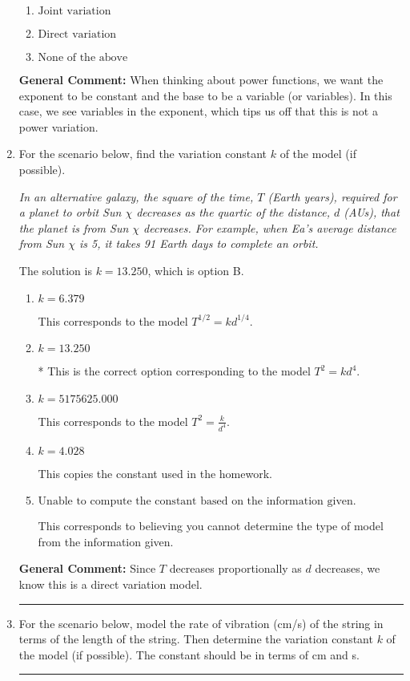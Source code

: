\documentclass{extbook}[14pt]
\newcommand{\litem}[1]{\item #1

\rule{\textwidth}{0.4pt}}
\begin{document}
\begin{enumerate}
{\begin{enumerate}[label=\Alph*.]
\item \( \text{Joint variation} \)


\item \( \text{Direct variation} \)


\item \( \text{None of the above} \)


\end{enumerate}

\textbf{General Comment:} When thinking about power functions, we want the exponent to be constant and the base to be a variable (or variables). In this case, we see variables in the exponent, which tips us off that this is not a power variation.
}
\litem{
For the scenario below, find the variation constant $k$ of the model (if possible).

\begin{center}
    \textit{ In an alternative galaxy, the square of the time, $T$ (Earth years), required for a planet to orbit Sun $\chi$ decreases as the quartic of the distance, $d$ (AUs), that the planet is from Sun $\chi$ decreases. For example, when Ea's average distance from Sun $\chi$ is 5, it takes 91 Earth days to complete an orbit. }
\end{center}
The solution is \( k = 13.250 \), which is option B.\begin{enumerate}[label=\Alph*.]
\item \( k = 6.379 \)

This corresponds to the model $T^{1/2} = k d^{1/4}$.
\item \( k = 13.250 \)

* This is the correct option corresponding to the model $T^{2} = k d^{4}$.
\item \( k = 5175625.000 \)

This corresponds to the model $T^{2} = \frac{k}{d^{4}}$.
\item \( k = 4.028 \)

This copies the constant used in the homework.
\item \( \text{Unable to compute the constant based on the information given.} \)

This corresponds to believing you cannot determine the type of model from the information given.
\end{enumerate}

\textbf{General Comment:} Since $T$ decreases proportionally as $d$ decreases, we know this is a direct variation model.
}
\litem{
For the scenario below, model the rate of vibration (cm/s) of the string in terms of the length of the string. Then determine the variation constant $k$ of the model (if possible). The constant should be in terms of cm and s.

}
\end{enumerate}
\end{document}

